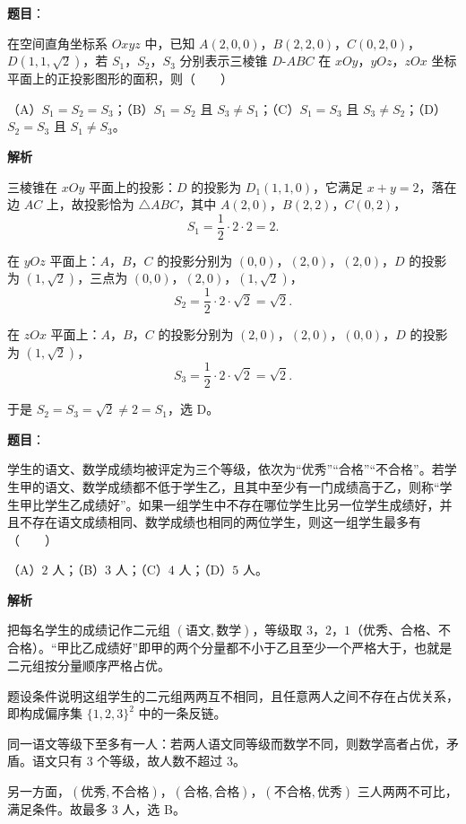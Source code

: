 \begin{answer}

\textbf{题目}：

在空间直角坐标系 $Oxyz$ 中，已知 $A(2,0,0)$，$B(2,2,0)$，$C(0,2,0)$，$D(1,1,\sqrt2)$，若 $S_1$，$S_2$，$S_3$ 分别表示三棱锥 $D\text{-}ABC$ 在 $xOy$，$yOz$，$zOx$ 坐标平面上的正投影图形的面积，则\mbox{（　　）}

（A）$S_1=S_2=S_3$；（B）$S_1=S_2$ 且 $S_3\neq S_1$；（C）$S_1=S_3$ 且 $S_3\neq S_2$；（D）$S_2=S_3$ 且 $S_1\neq S_3$。

\textbf{解析}

三棱锥在 $xOy$ 平面上的投影：$D$ 的投影为 $D_1(1,1,0)$，它满足 $x+y=2$，落在边 $AC$ 上，故投影恰为 $\triangle ABC$，其中 $A(2,0)$，$B(2,2)$，$C(0,2)$，
\nopagebreak[4]
\[S_1=\frac12\cdot2\cdot2=2 .\]

在 $yOz$ 平面上：$A$，$B$，$C$ 的投影分别为 $(0,0)$，$(2,0)$，$(2,0)$，$D$ 的投影为 $(1,\sqrt2)$，三点为 $(0,0)$，$(2,0)$，$(1,\sqrt2)$，
\nopagebreak[4]
\[S_2=\frac12\cdot2\cdot\sqrt2=\sqrt2 .\]

在 $zOx$ 平面上：$A$，$B$，$C$ 的投影分别为 $(2,0)$，$(2,0)$，$(0,0)$，$D$ 的投影为 $(1,\sqrt2)$，
\nopagebreak[4]
\[S_3=\frac12\cdot2\cdot\sqrt2=\sqrt2 .\]

于是 $S_2=S_3=\sqrt2\neq2=S_1$，选 D。


\end{answer}
\begin{answer}

\textbf{题目}：

学生的语文、数学成绩均被评定为三个等级，依次为“优秀”“合格”“不合格”。若学生甲的语文、数学成绩都不低于学生乙，且其中至少有一门成绩高于乙，则称“学生甲比学生乙成绩好”。如果一组学生中不存在哪位学生比另一位学生成绩好，并且不存在语文成绩相同、数学成绩也相同的两位学生，则这一组学生最多有\mbox{（　　）}

（A）$2$ 人；（B）$3$ 人；（C）$4$ 人；（D）$5$ 人。

\textbf{解析}

把每名学生的成绩记作二元组 $(\text{语文},\text{数学})$，等级取 $3$，$2$，$1$（优秀、合格、不合格）。“甲比乙成绩好”即甲的两个分量都不小于乙且至少一个严格大于，也就是二元组按分量顺序严格占优。

题设条件说明这组学生的二元组两两互不相同，且任意两人之间不存在占优关系，即构成偏序集 $\{1,2,3\}^2$ 中的一条反链。

同一语文等级下至多有一人：若两人语文同等级而数学不同，则数学高者占优，矛盾。语文只有 $3$ 个等级，故人数不超过 $3$。

另一方面，$(\text{优秀},\text{不合格})$，$(\text{合格},\text{合格})$，$(\text{不合格},\text{优秀})$ 三人两两不可比，满足条件。故最多 $3$ 人，选 B。


\end{answer}

